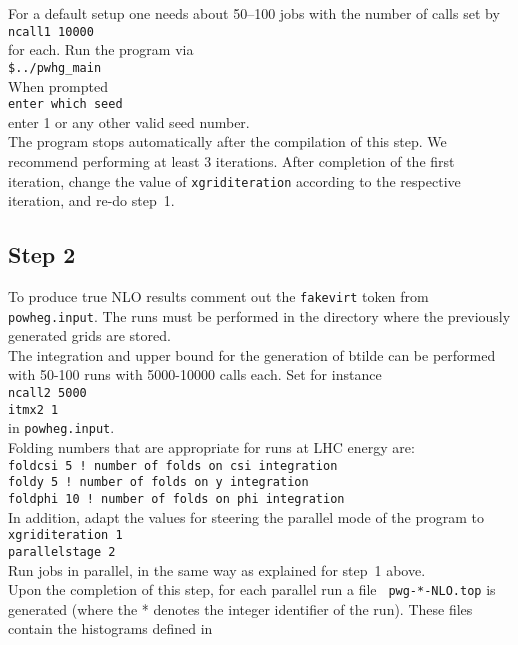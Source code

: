 \documentclass[a4paper,11pt]{article}
\begin{document}
For a default setup one needs about 50--100 jobs with the number of calls set by
\\[2ex] 
{\tt ncall1 10000}
\\[2ex] 
for each. 
%
Run the program via
\\[2ex]
{\tt \$../pwhg\_main}
\\[2ex]
When prompted
\\[2ex]
{\tt enter which seed}
\\[2ex]
enter 1 or any other valid seed number.
\\[2ex]
The program stops automatically after the compilation of
this step.
%
We recommend performing at least  3 iterations. After completion of the first iteration, change the value of {\tt xgriditeration} according to the respective iteration, and re-do step~1. 
%
\subsection*{Step 2}
%
To produce true NLO results comment out the {\tt fakevirt} token from {\tt powheg.input}.
The runs must be performed in the directory where the previously generated grids are stored.
\\[2ex]
The integration and upper bound for the generation of btilde can be
performed with 50-100 runs with 5000-10000 calls each. Set for
instance
\\[2ex]
{\tt ncall2 5000}
\\
{\tt itmx2 1}
\\[2ex]
in {\tt powheg.input}.
\\[2ex]
Folding numbers that are appropriate for runs at LHC energy are:
\\[2ex]
{\tt foldcsi 5 ! number of folds on csi integration}
\\
{\tt foldy 5 ! number of folds on y integration}
\\
{\tt foldphi 10 ! number of folds on phi integration}
\\[2ex]
%
In addition, adapt the values for steering the parallel mode of the program to 
\\[2ex]
{\tt xgriditeration   1}
\\
{\tt parallelstage  2}
\\[2ex]
%
Run jobs in parallel, in the same way as explained for step~1 above. 
\\[2ex]
Upon the completion of this step, for each parallel run a file {\tt
  pwg-*-NLO.top} is generated (where the * denotes the integer
identifier of the run).  These files contain the histograms defined in
\end{document}
